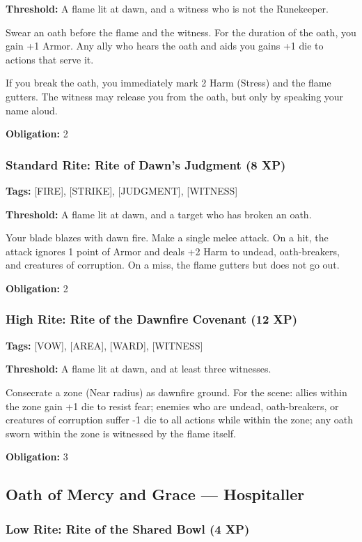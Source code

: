 \textbf{Threshold:} A flame lit at dawn, and a witness who is not the Runekeeper.

Swear an oath before the flame and the witness. For the duration of the oath, you gain +1 Armor. Any ally who hears the oath and aids you gains +1 die to actions that serve it.

If you break the oath, you immediately mark 2 Harm (Stress) and the flame gutters. The witness may release you from the oath, but only by speaking your name aloud.

\textbf{Obligation:} 2

\subsubsection{Standard Rite: Rite of Dawn's Judgment (8 XP)}

\textbf{Tags:} [FIRE], [STRIKE], [JUDGMENT], [WITNESS]

\textbf{Threshold:} A flame lit at dawn, and a target who has broken an oath.

Your blade blazes with dawn fire. Make a single melee attack. On a hit, the attack ignores 1 point of Armor and deals +2 Harm to undead, oath-breakers, and creatures of corruption. On a miss, the flame gutters but does not go out.

\textbf{Obligation:} 2

\subsubsection{High Rite: Rite of the Dawnfire Covenant (12 XP)}

\textbf{Tags:} [VOW], [AREA], [WARD], [WITNESS]

\textbf{Threshold:} A flame lit at dawn, and at least three witnesses.

Consecrate a zone (Near radius) as dawnfire ground. For the scene: allies within the zone gain +1 die to resist fear; enemies who are undead, oath-breakers, or creatures of corruption suffer -1 die to all actions while within the zone; any oath sworn within the zone is witnessed by the flame itself.

\textbf{Obligation:} 3

\subsection{Oath of Mercy and Grace — Hospitaller}

\subsubsection{Low Rite: Rite of the Shared Bowl (4 XP)}

